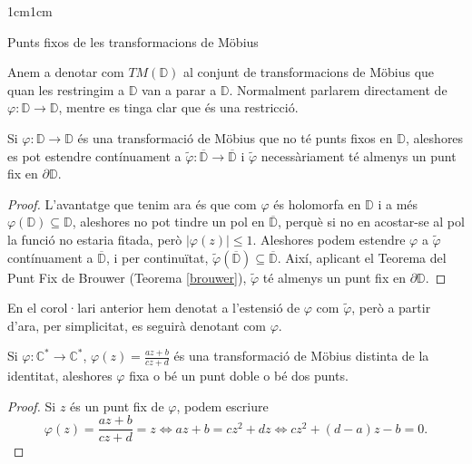 \begin{adjustwidth}{1cm}{1cm}
\begin{subsection}{Punts fixos de les transformacions de Möbius}
\begin{nota}
    Anem a denotar com $TM(\mathbb{D})$ al conjunt de transformacions de Möbius que quan les restringim a $\mathbb{D}$ van a parar a $\mathbb{D}$. Normalment parlarem directament de $\varphi:\mathbb{D}\to \mathbb{D}$, mentre es tinga clar que és una restricció.
    \label{notacio_TM}
\end{nota}

\begin{corolari}
    Si $\varphi:\mathbb{D}\to \mathbb{D}$ és una transformació de Möbius que no té punts fixos en $\mathbb{D}$, aleshores es pot estendre contínuament a $\tilde{\varphi}:\overline{\mathbb{D}}\to\overline{\mathbb{D}}$ i $\tilde{\varphi}$
    necessàriament té almenys un punt fix en $\partial \mathbb{D}$.
    \label{extensio_cont_TM}
\end{corolari}

\begin{proof}
    L'avantatge que tenim ara és que com $\varphi$ és holomorfa en $\mathbb{D}$ i a més $\varphi(\mathbb{D})\subseteq \mathbb{D}$, aleshores no pot tindre un pol en $\overline{\mathbb{D}}$, perquè si no en acostar-se al pol la funció no estaria fitada, però $|\varphi(z)|\leq 1$. Aleshores podem estendre $\varphi$ a $\tilde{\varphi}$ contínuament  a $\overline{\mathbb{D}}$, i per continuïtat, $\tilde{\varphi}(\overline{\mathbb{D}})\subseteq \overline{\mathbb{D}}$. Així, aplicant el Teorema del Punt Fix de Brouwer (Teorema \ref{brouwer}), $\tilde{\varphi}$ té almenys un punt fix en $\partial \mathbb{D}$.
\end{proof}

\begin{nota}
    En el corol·lari anterior hem denotat a l'estensió de $\varphi$ com $\tilde{\varphi}$, però a partir d'ara, per simplicitat, es seguirà denotant com $\varphi$.
\end{nota}

\begin{proposicio}
    Si $\varphi:\mathbb{C}^*\to \mathbb{C}^*$, $\varphi(z)=\frac{az+b}{cz+d}$ és una transformació de Möbius distinta de la identitat, aleshores  $\varphi$ fixa o bé un punt doble o bé dos punts. 
    \label{transformació_moeb_fix}
\end{proposicio}

\begin{proof}
    Si $z$ és un punt fix de $\varphi$, podem escriure 
    \[
        \varphi(z)=\frac{az+b}{cz+d}=z \iff az+b=cz^2+dz\iff cz^2+(d-a)z-b=0.
    \]


\end{proof}
\end{subsection}
\end{adjustwidth}
